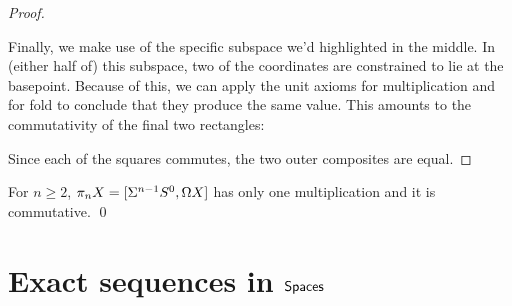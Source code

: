 \begin{proof}
\begin{center}
\end{center}
Finally, we make use of the specific subspace we'd highlighted in the middle.
In (either half of) this subspace, two of the coordinates are constrained to lie at the basepoint.
Because of this, we can apply the unit axioms for multiplication and for fold to conclude that they produce the same value.
This amounts to the commutativity of the final two rectangles:
\begin{center}
\end{center}
Since each of the squares commutes, the two outer composites are equal.
\end{proof}

\begin{corollary}
For $n \ge 2$, $\pi_n X = [\Sigma^{n-1} S^0, \Omega X]$ has only one multiplication and it is commutative. \qed
\end{corollary}




\section{Exact sequences in $\mathsf{Spaces}$}

